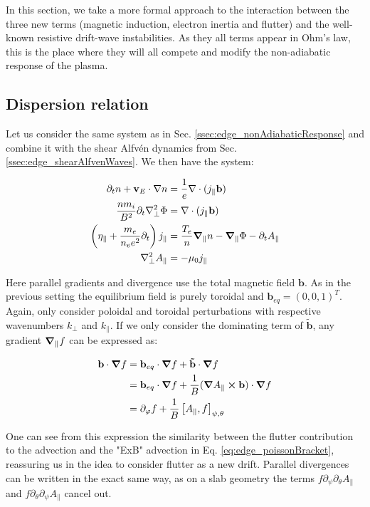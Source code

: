 In this section, we take a more formal approach to the interaction between the three new terms (magnetic induction, electron inertia and flutter) and the well-known resistive drift-wave instabilities. As they all terms appear in Ohm's law, this is the place where they will all compete and modify the non-adiabatic response of the plasma. 

\subsection{Dispersion relation}
\label{ssec:edge_DAW_dispersionRelation}

Let us consider the same system as in Sec. \ref{ssec:edge_nonAdiabaticResponse} and combine it with the shear Alfvén dynamics from Sec. \ref{ssec:edge_shearAlfvenWaves}. We then have the system: 

\begin{align}
	\partial_t n + \mathbf{v}_E\cdot\nabla n &= \frac{1}{e}\nabla\cdot(j_\parallel \mathbf{b}) \\
	\frac{nm_i}{B^2}\partial_t\nabla_\perp^2\Phi &= \nabla\cdot(j_\parallel \mathbf{b}) \\
	\left(\eta_\parallel + \frac{m_e}{n_ee^2}\partial_t \right) j_\parallel &= \frac{T_e}{n}\grad_\parallel n - \grad_\parallel \Phi - \partial_t A_\parallel \\
	\nabla_\perp^2 A_\parallel &= -\mu_0 j_\parallel
\end{align}

Here parallel gradients and divergence use the total magnetic field $\mathbf{b}$. As in the previous setting the equilibrium field is purely toroidal and $\mathbf{b}_{eq} = (0,0,1)^T$. Again, only consider poloidal and toroidal perturbations with respective wavenumbers $k_\perp$ and $k_\parallel$. If we only consider the dominating term of $\mathbf{\tilde{b}}$, any gradient $\grad_\parallel f$ can be expressed as:

\begin{align}
	\mathbf{b}\cdot\grad f &= \mathbf{b}_{eq}\cdot\grad f + \mathbf{\tilde{b}} \cdot \grad f \nonumber\\
	&= \mathbf{b}_{eq}\cdot\grad f + \frac{1}{B}(\grad A_\parallel \cross \mathbf{b})\cdot\grad f \nonumber\\ 
	&= \partial_\varphi f + \frac{1}{B}\left[A_\parallel,f\right]_{\psi,\theta}
\end{align}

One can see from this expression the similarity between the flutter contribution to the advection and the "ExB" advection in Eq. \ref{eq:edge_poissonBracket}, reassuring us in the idea to consider flutter as a new drift. Parallel divergences can be written in the exact same way, as on a slab geometry the terms $f\partial_\psi\partial_\theta A_\parallel$ and $f\partial_\theta\partial_\psi A_\parallel$ cancel out.

